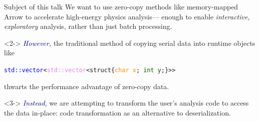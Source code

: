 \documentclass[aspectratio=169]{beamer}
\begin{document}

\begin{frame}{Subject of this talk}
\vspace{0.5 cm}
We want to use zero-copy methods like memory-mapped Arrow to accelerate high-energy physics analysis--- enough to enable {\it interactive, exploratory} analysis, rather than just batch processing.

\vspace{0.75 cm}
\begin{uncoverenv}<2->
\textcolor{darkblue}{\it However,} the traditional method of copying serial data into runtime objects like
\begin{center}
\tt\small \textcolor{blue}{std::vector}<\textcolor{violet}{std::vector}<struct\{\textcolor{darkorange}{char x}; \textcolor{darkgreen}{int y};\}>>
\end{center}
thwarts the performance advantage of zero-copy data.
\end{uncoverenv}

\vspace{0.75 cm}
\begin{uncoverenv}<3->
\textcolor{darkblue}{\it Instead,} we are attempting to transform the user's analysis code to access the data in-place: code transformation as an alternative to deserialization.
\end{uncoverenv}
\end{frame}
\end{document}
